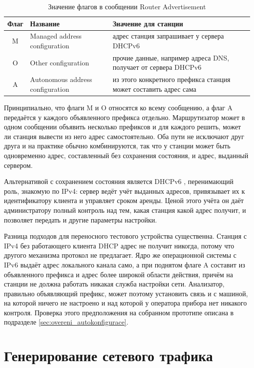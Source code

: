 \begin{table}[htbp]
    \caption{Значение флагов в сообщении Router Advertisement}
    \label{tab:priznaky}
    \centering
    \begin{tabular}{clp{7.5cm}}
        \hline
        Флаг & Название & Значение для станции \\
        \hline
        M & Managed address configuration & адрес станция запрашивает у сервера DHCPv6 \\
        O & Other configuration & прочие данные, например адреса DNS, получает от сервера DHCPv6 \\
        A & Autonomous address configuration & из этого конкретного префикса станция может составить адрес сама \\
        \hline
    \end{tabular}
\end{table}

Принципиально, что флаги M и O относятся ко всему сообщению, а флаг A передаётся у каждого объявленного префикса отдельно. Маршрутизатор может в одном сообщении объявить несколько префиксов и для каждого решить, может ли станция вывести из него адрес самостоятельно. Оба пути не исключают друг друга и на практике обычно комбинируются, так что у станции может быть одновременно адрес, составленный без сохранения состояния, и адрес, выданный сервером.

Альтернативой с сохранением состояния является DHCPv6 \cite{rfc8415}, перенимающий роль, знакомую по IPv4: сервер ведёт учёт выданных адресов, привязывает их к идентификатору клиента и управляет сроком аренды. Ценой этого учёта он даёт администратору полный контроль над тем, какая станция какой адрес получит, и позволяет передать и другие параметры настройки.

Разница подходов для переносного тестового устройства существенна. Станция с IPv4 без работающего клиента DHCP адрес не получит никогда, потому что другого механизма протокол не предлагает. Ядро же операционной системы с IPv6 выдаёт адрес локального канала само, а при поднятом флаге A составит из объявленного префикса и адрес более широкой области действия, причём на станции не должна работать никакая служба настройки сети. Анализатор, правильно объявляющий префикс, может поэтому установить связь и с машиной, на которой ничего не настроено и над которой у оператора прибора нет никакого контроля. Проверка этого предположения на собранном прототипе описана в подразделе \ref{sec:overeni_autokonfigurace}.

\section{Генерирование сетевого трафика}
\label{sec:generovani}

